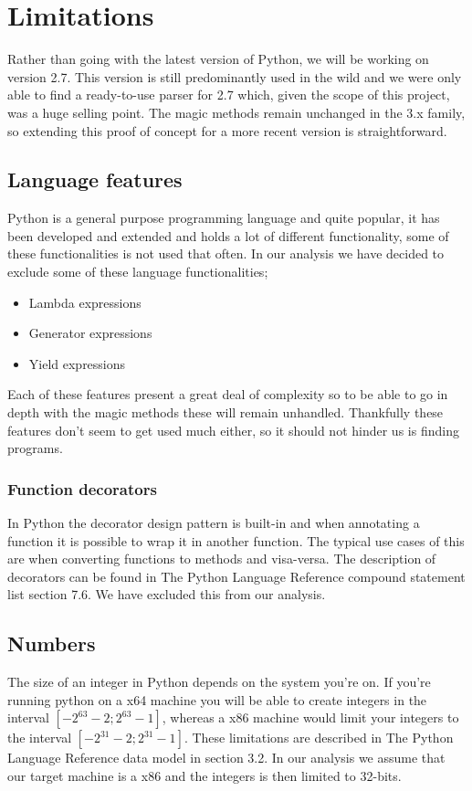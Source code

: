 \chapter{Limitations}

Rather than going with the latest version of Python, we will be working on version 2.7. This version is still predominantly used in the wild and we were only able to find a ready-to-use parser for 2.7 which, given the scope of this project, was a huge selling point. The magic methods remain unchanged in the 3.x family, so extending this proof of concept for a more recent version is straightforward.

\section{Language features}
Python is a general purpose programming language and quite popular, it has been developed and extended and holds a lot of different functionality, some of these functionalities is not used that often. In our analysis we have decided to exclude some of these language functionalities;

\begin{itemize}
	\item Lambda expressions
	\item Generator expressions
	\item Yield expressions
\end{itemize}

Each of these features present a great deal of complexity so to be able to go in depth with the magic methods these will remain unhandled. Thankfully these features don't seem to get used much either, so it should not hinder us is finding programs.

\subsection{Function decorators}
In Python the decorator design pattern is built-in and when annotating a function it is possible to wrap it in another function. The typical use cases of this are when converting functions to methods and visa-versa. The description of decorators can be found in The Python Language Reference compound statement list\cite{pyref.compound} section 7.6. We have excluded this from our analysis.

\section{Numbers}
The size of an integer in Python depends on the system you're on. If you're running python on a x64 machine you will be able to create integers in the interval $[-2^{63}-2;2^{63}-1]$, whereas a x86 machine would limit your integers to the interval $[-2^{31}-2;2^{31}-1]$. These limitations are described in The Python Language Reference data model\cite{pyref.datamodel} in section 3.2. In our analysis we assume that our target machine is a x86 and the integers is then limited to 32-bits.

